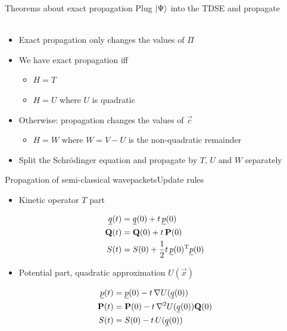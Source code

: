 \documentclass{beamer}
\begin{document}
\begin{frame}{Theorems about exact propagation}
  Plug $\Ket{\Psi}$ into the TDSE and propagate \\~ \\
  \begin{itemize}
  \item Exact propagation only changes the values of $\Pi$
  \item We have exact propagation iff
    \begin{itemize}
    \item $H = T$
    \item $H = U$ where $U$ is quadratic
    \end{itemize}
  \item Otherwise: propagation changes the values of $\vec{c}$
    \begin{itemize}
    \item $H = W$ where $W = V - U$ is the non-quadratic remainder
    \end{itemize}
  \item Split the Schrödinger equation and propagate by $T$, $U$ and $W$ separately
  \end{itemize}
\end{frame}


\begin{frame}{Propagation of semi-classical wavepackets}{Update rules}
  \begin{itemize}
  \item Kinetic operator $T$ part
  \end{itemize}
  \begin{equation*}
    \begin{split}
      \underline{q}(t) & = \underline{q}(0) + t \,  \underline{p}(0) \\
      \mathbf{Q}(t) & = \mathbf{Q}(0) + t \,  \mathbf{P}(0) \\
      S(t) & = S(0) + \frac{1}{2}t \, \underline{p}(0){}^{\textnormal{T}}  \underline{p}(0)
    \end{split}
  \end{equation*}
  \begin{itemize}
  \item Potential part, quadratic approximation $U(\vec{x})$
  \end{itemize}
  \begin{equation*}
    \begin{split}
      \underline{p}(t) & = \underline{p}(0) - t \, \nabla U(\underline{q}(0)) \\
      \mathbf{P}(t) & = \mathbf{P}(0) - t \, \nabla^2 U(\underline{q}(0)) \mathbf{Q}(0) \\
      S(t) & = S(0) - t \, U(\underline{q}(0))
    \end{split}
  \end{equation*}
\end{frame}
\end{document}
